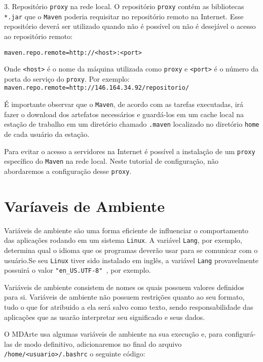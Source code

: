 3. Repositório \texttt{proxy} na rede local. O repositório \texttt{proxy} contém
as bibliotecas \texttt{*.jar} que o \texttt{Maven} poderia requisitar no
repositório remoto na Internet. Esse repositório deverá ser utilizado quando não
é possível ou não é desejável o acesso ao repositório remoto:

\begin{verbatim}
maven.repo.remote=http://<host>:<port> 
\end{verbatim}

Onde \texttt{<host>} é o nome da máquina utilizada como \texttt{proxy} e
\texttt{<port>} é o número da porta do serviço do \texttt{proxy}. Por exemplo:
\texttt{maven.repo.remote=http://146.164.34.92/repositorio/}

É importante observar que o \texttt{Maven}, de acordo com as tarefas executadas,
irá fazer o download dos artefatos necessários e guardá-los em um cache local na
estação de trabalho em um diretório chamado \texttt{.maven} localizado no
diretório \texttt{home} de cada usuário da estação.

Para evitar o acesso a servidores na Internet é possível a instalação de um
\texttt{proxy} específico do \texttt{Maven} na rede local. Neste tutorial de
configuração, não abordaremos a configuração desse \texttt{proxy}.

\section{Varíaveis de Ambiente}

Variáveis de ambiente são uma forma eficiente de influenciar o comportamento das
aplicações rodando em um sistema \texttt{Linux}. A variável \texttt{Lang}, por
exemplo, determina qual o idioma que os programas deverão usar para se comunicar
com o usuário.Se seu \texttt{Linux} tiver sido instalado em inglês, a variável \texttt{Lang}
provavelmente possuirá o valor \texttt{"en_US.UTF-8" }, por exemplo.

Variáveis de ambiente consistem de nomes os quais possuem valores definidos para
si. Variáveis de ambiente não possuem restrições quanto ao seu formato, tudo o
que for atribuido a ela será salvo como texto, sendo responsabilidade das
aplicações que as usarão interpretar seu significado e seus dados. 

O MDArte usa algumas variáveis de ambiente na sua execução e, para configurá-las
de modo definitivo, adicionaremos no final do arquivo
\texttt{/home/<usuario>/.bashrc} o seguinte código:

